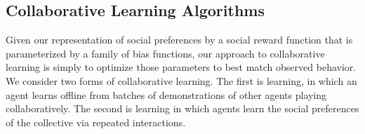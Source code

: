 
\subsection{Collaborative Learning Algorithms}
\label{sec:learning}

Given our representation of social preferences by a social reward
function that is parameterized by a family of bias functions, our
approach to collaborative learning is simply to optimize those
parameters to best match observed behavior.  We consider two forms of
collaborative learning.  The first is  learning, in which
an agent learns offline from batches of demonstrations of other agents
playing collaboratively.  The second is  learning
in which agents learn the social preferences of the collective via
repeated interactions.



